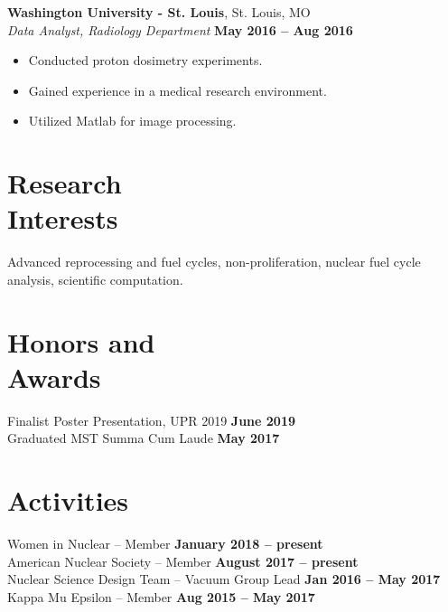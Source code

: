 \documentclass[margin,line]{resume}
\begin{document}
\begin{resume}
    \textbf{Washington University - St. Louis}, St. Louis, MO\\
		\textsl{Data Analyst, Radiology Department} \hfill \textbf{May 2016 -- Aug 2016}\\
		\begin{itemize}
			\item Conducted proton dosimetry experiments.
			\item Gained experience in a medical research environment.
			\item Utilized Matlab for image processing.
		\end{itemize}
	\section{\mysidestyle Research\\Interests}
	Advanced reprocessing and fuel cycles, non-proliferation, 
		nuclear fuel cycle analysis, scientific computation.%
    \section{\mysidestyle Honors and\\Awards}
    Finalist Poster Presentation, UPR 2019 \hfill \textbf{June 2019}\\
    Graduated MST Summa Cum Laude \hfill \textbf{May 2017}
    
    \section{\mysidestyle Activities}
    Women in Nuclear – Member \hfill \textbf{January 2018 -- present}\\
    American Nuclear Society – Member \hfill \textbf{August 2017 -- present}\\
    Nuclear Science Design Team – Vacuum Group Lead \hfill \textbf{Jan 2016 -- May 2017}\\
    Kappa Mu Epsilon – Member \hfill \textbf{Aug 2015 -- May 2017}


\end{resume}
\end{document}
